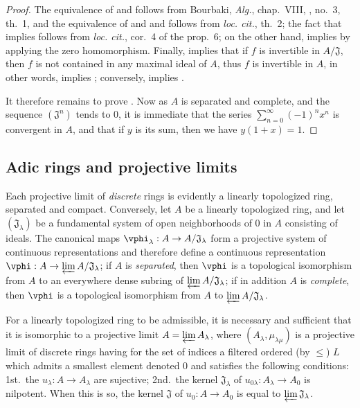 \begin{proof}
\label{proof-0.7.1.10}
The equivalence of  and 
follows from Bourbaki, \emph{Alg.}, chap.~VIII, , no.~3,
th.~1, and the equivalence of  and
 and  follows from
\emph{loc. cit.}, th.~2; the fact that  implies
 follows from \emph{loc. cit.},
cor.~4 of the prop.~6; on the other hand,  implies
 by applying the zero homomorphism. Finally,
 implies that if $f$ is invertible in $A/\mathfrak{J}$,
then $f$ is not contained in any maximal ideal of $A$, thus $f$ is invertible in $A$,
in other words,  implies ;
conversely,  implies .

It therefore remains to prove . Now as $A$ is separated and
complete, and the sequence $(\mathfrak{J}^n)$ tends to $0$, it is immediate that
the series $\sum_{n=0}^\infty(-1)^n x^n$ is convergent in $A$, and that if $y$
is its sum, then we have $y(1+x)=1$.
\end{proof}

\subsection{Adic rings and projective limits}
\label{subsection:0.7.2}

\begin{env}[7.2.1]
\label{0.7.2.1}
Each projective limit of \emph{discrete} rings is evidently a linearly
topologized ring, separated and compact. Conversely, let $A$ be a linearly
topologized ring, and let $(\mathfrak{J}_\lambda)$ be a fundamental system of
open neighborhoods of $0$ in $A$ consisting of
ideals. The canonical maps $\vphi_\lambda:A\to A/\mathfrak{J}_\lambda$ form
a projective system of continuous representations and therefore define a
continuous representation $\vphi:A\to\varprojlim A/\mathfrak{J}_\lambda$; if $A$
is \emph{separated}, then $\vphi$ is a topological isomorphism from $A$ to an
everywhere dense subring of $\varprojlim A/\mathfrak{J}_\lambda$; if in
addition $A$ is \emph{complete}, then $\vphi$ is a topological isomorphism from
$A$ to $\varprojlim A/\mathfrak{J}_\lambda$.
\end{env}

\begin{lemma}[7.2.2]
\label{0.7.2.2}
For a linearly topologized ring to be admissible, it is necessary and sufficient
that it is isomorphic to a projective limit $A=\varprojlim A_\lambda$, where
$(A_\lambda,\mu_{\lambda\mu})$ is a projective limit of discrete rings having
for the set of indices a filtered ordered (by $\leq$) $L$ which admits
a smallest element denoted $0$ and satisfies the following conditions:
1st.~the $u_\lambda:A\to A_\lambda$ are sujective;
2nd.~the kernel $\mathfrak{J}_\lambda$ of
$u_{0\lambda}:A_\lambda\to A_0$ is nilpotent. When this is so, the kernel
$\mathfrak{J}$ of $u_0:A\to A_0$ is equal to $\varprojlim\mathfrak{J}_\lambda$.
\end{lemma}

